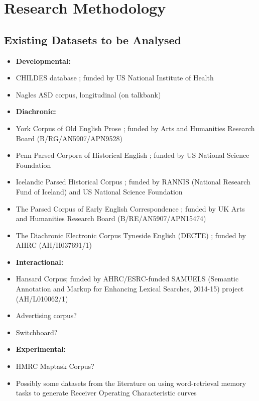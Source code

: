 \documentclass[11pt]{article}
\begin{document}
\section{Research Methodology}
\subsection{Existing Datasets to be Analysed}
\begin{itemize}
	\item[] \textbf{Developmental:}
	\item CHILDES database \citep{macwhinney1996,macwhinney2014}; funded by US National Institute of Health
	\item Nagles ASD corpus, longitudinal (on talkbank)
	\item[] \textbf{Diachronic:}
	\item York Corpus of Old English Prose \citep{ycoe}; funded by Arts and Humanities Research Board (B/RG/AN5907/APN9528)
	\item Penn Parsed Corpora of Historical English \citep{ppcme24, ppceme, ppcmbe2}; funded by US National Science Foundation
	\item Icelandic Parsed Historical Corpus \citep{icepahc09}; funded by RANNIS (National Research Fund of Iceland) and US National Science Foundation
	\item The Parsed Corpus of Early English Correspondence \citep{pceec} \nocite{corpussearch}; funded by UK Arts and Humanities Research Board (B/RE/AN5907/APN15474)
	\item The Diachronic Electronic Corpus Tyneside English (DECTE) \cite{decte}; funded by AHRC (AH/H037691/1)
	\item[] \textbf{Interactional:}
	\item Hansard Corpus; funded by AHRC/ESRC-funded SAMUELS (Semantic Annotation and Markup for Enhancing Lexical Searches, 2014-15) project (AH/L010062/1)
	\item Advertising corpus?
	\item Switchboard?
	\item[] \textbf{Experimental:}
	\item HMRC Maptask Corpus?
	\item Possibly some datasets from the literature on using word-retrieval memory tasks to generate Receiver Operating Characteristic curves
\end{itemize}
\end{document}
